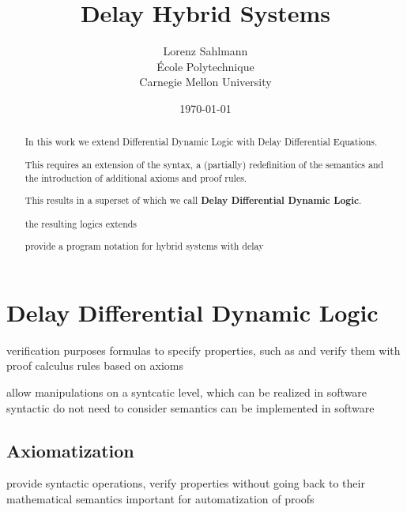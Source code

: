 \documentclass[10pt]{report}
\begin{document}
\title{Delay Hybrid Systems}

\author{Lorenz Sahlmann\\ École Polytechnique\\ Carnegie Mellon University}
\date{\today}

\maketitle

\begin{abstract}
    In this work we extend Differential Dynamic Logic with Delay Differential Equations.

    This requires an extension of the syntax, a (partially) redefinition of the semantics and the introduction of additional axioms and proof rules.

    This results in a superset of \dL which we call \textbf{Delay Differential Dynamic Logic}.

    the resulting logics extends

    provide a program notation for hybrid systems with delay
\end{abstract}


%



%



%
\chapter{Delay Differential Dynamic Logic}
\label{sec:delay-differential-dynamic-logic}

verification purposes
\ddL formulas to specify properties, such as
and verify them with proof calculus
rules based on axioms

allow manipulations on a syntcatic level, which can be realized in software
syntactic
do not need to consider semantics
can be implemented in software

\section{Axiomatization}
    \label{sec:axioms}


    provide syntactic operations, verify properties without going back to their mathematical semantics
    important for automatization of proofs
\end{document}

